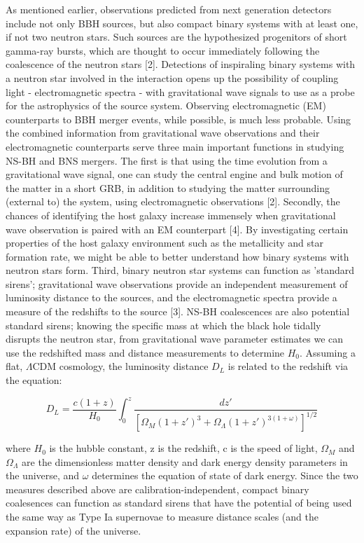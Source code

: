 \documentclass{article}
\begin{document}
As mentioned earlier, observations predicted from next generation detectors include not only BBH sources, but also compact binary systems with at least one, if not two neutron stars.  Such sources are the hypothesized progenitors of short gamma-ray bursts, which are thought to occur immediately following the coalescence of the neutron stars [2].  Detections of inspiraling binary systems with a neutron star involved in the interaction opens up the possibility of coupling light - electromagnetic spectra - with gravitational wave signals to use as a probe for the astrophysics of the source system.  Observing electromagnetic (EM) counterparts to BBH merger events, while possible, is much less probable.  Using the combined information from gravitational wave observations and their electromagnetic counterparts serve three main important functions in studying NS-BH and BNS mergers.  The first is that using the time evolution from a gravitational wave signal, one can study the central engine and bulk motion of the matter in a short GRB, in addition to studying the matter surrounding (external to) the system, using electromagnetic observations [2].  Secondly, the chances of identifying the host galaxy increase immensely when gravitational wave observation is paired with an EM counterpart [4].  By investigating certain properties of the host galaxy environment such as the metallicity and star formation rate, we might be able to better understand how binary systems with neutron stars form.  Third, binary neutron star systems can function as 'standard sirens'; gravitational wave observations provide an independent measurement of luminosity distance to the sources, and the electromagnetic spectra provide a measure of the redshifts to the source [3].  NS-BH coalescences are also potential standard sirens; knowing the specific mass at which the black hole tidally disrupts the neutron star, from gravitational wave parameter estimates we can use the redshifted mass and distance measurements to determine $H_{0}$.  Assuming a flat, $\Lambda$CDM cosmology, the luminosity distance $D_L$ is related to the redshift via the equation:

\begin{equation} D_L = \frac{c(1+z)}{H_0}\int_{0}^{z} \frac{dz'}{[\Omega_M(1+z')^3 + \Omega_{\Lambda}(1+z')^{3(1+\omega)}]^{1/2}} \end{equation}

where $H_0$ is the hubble constant, z is the redshift, c is the speed of light, $\Omega_M$ and $\Omega_{\Lambda}$ are the dimensionless matter density and dark energy density parameters in the universe, and $\omega$ determines the equation of state of dark energy.  Since the two measures described above are calibration-independent, compact binary coalesences can function as standard sirens that have the potential of being used the same way as Type Ia supernovae to measure distance scales (and the expansion rate) of the universe.  
\end{document}
